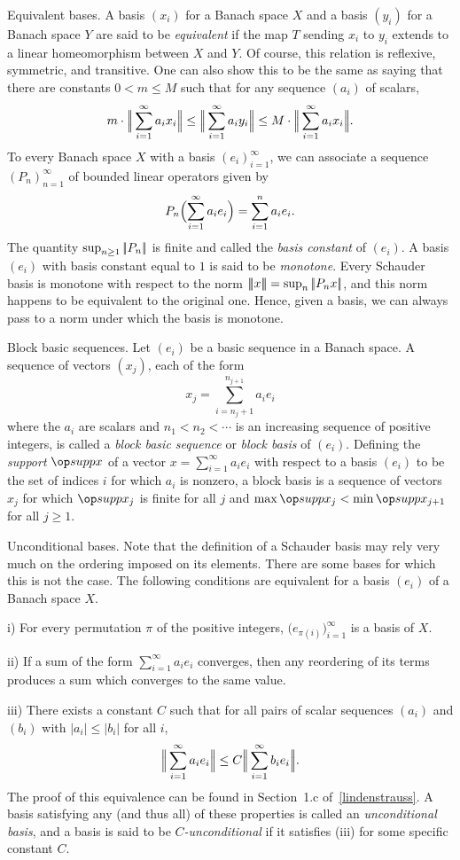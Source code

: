 \medskip\boldlabel Equivalent bases.
A basis $(x_i)$ for a Banach space $X$ and a basis $(y_i)$ for a Banach space $Y$ are
said to be {\it equivalent} if the map $T$ sending $x_i$ to $y_i$ extends to a linear homeomorphism
between $X$ and $Y$. Of course, this relation is reflexive, symmetric, and transitive.
One can also show this to be the same as saying that there are constants $0<m\le M$ such that
for any sequence $(a_i)$ of scalars,
$$m\cdot\Big|\!\Big|\sum_{i=1}^\infty a_ix_i\Big|\!\Big|\le\Big|\!\Big|\sum_{i=1}^\infty a_iy_i\Big|\!\Big|\le
 M\cdot\Big|\!\Big|\sum_{i=1}^\infty a_ix_i\Big|\!\Big|.$$
To every Banach space $X$ with a basis $(e_i)_{i=1}^\infty$,
we can associate a sequence $(P_n)_{n=1}^\infty$ of bounded linear operators given by
$$P_n\Bigl(\sum_{i=1}^\infty a_ie_i\Bigr) = \sum_{i=1}^n a_ie_i.$$
The quantity $\sup_{n\ge 1} |\!|P_n|\!|$ is finite and called the {\it basis constant} of $(e_i)$.
A basis $(e_i)$ with basis constant equal to $1$ is said to be {\it monotone}. Every Schauder basis
is monotone with respect to the norm $|\!|\!|x|\!|\!| = \sup_n |\!|P_n x|\!|$, and this norm happens to be
equivalent to the original one. Hence, given a basis, we can always pass to a norm under which the basis
is monotone.

\medskip\boldlabel Block basic sequences.
Let $(e_i)$ be a basic sequence in a Banach space. A sequence of vectors $(x_j)$, each of the form
$$x_j = \sum_{i=n_j+1}^{n_{j+1}} a_ie_i$$
where the $a_i$ are scalars and $n_1<n_2<\cdots$ is an increasing sequence of positive integers, is
called a {\it block basic sequence} or {\it block basis} of $(e_i)$.
Defining the {\it support} $\supp x$ of a vector
$ x = \sum_{i=1}^\infty a_i e_i$ with respect to a basis $(e_i)$
to be the set of indices $i$ for which $a_i$ is nonzero, a block basis is a sequence of vectors $x_j$ for
which $\supp x_j$ is finite for all $j$ and $\max \supp x_j < \min \supp x_{j+1}$ for all $j\ge 1$.

\medskip\boldlabel Unconditional bases.
Note that the definition of a Schauder basis may rely very much on the ordering
imposed on its elements. There are some bases for which this is not the case. The following conditions are
equivalent for a basis $(e_i)$ of a Banach space $X$.
\medskip
\item{i)} For every permutation $\pi$ of the positive integers, $\bigl(e_{\pi(i)}\bigr)_{i=1}^\infty$ is
a basis of $X$.
\smallskip
\item{ii)} If a sum of the form $\sum_{i=1}^\infty a_i e_i$ converges, then any reordering of its terms
produces a sum which converges to the same value.
\smallskip
\item{iii)} There exists a constant $C$ such that for all pairs of scalar sequences $(a_i)$ and $(b_i)$
with $|a_i|\le |b_i|$ for all $i$,
$$\Big|\!\Big|\sum_{i=1}^\infty a_ie_i\Big|\!\Big| \le C\Big|\!\Big|\sum_{i=1}^\infty b_ie_i\Big|\!\Big|.$$
\medskip
The proof of this equivalence can be found in Section~1.c of~\ref{lindenstrauss}. A basis satisfying any
(and thus all) of these properties is called an {\it unconditional basis}, and a basis is said to be
{\it $C$-unconditional} if it satisfies (iii) for some specific constant $C$.

